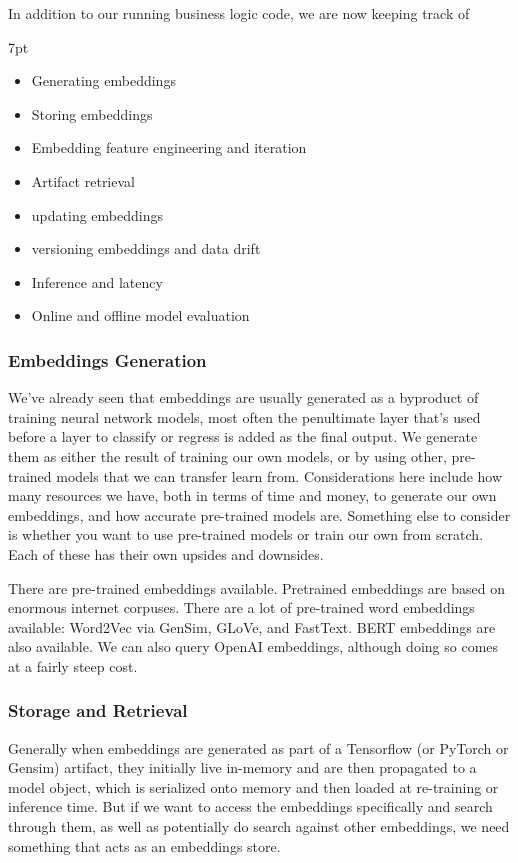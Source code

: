 \documentclass[11pt, table]{diazessay} %
\newenvironment{formal}{%
  \def\FrameCommand{%
	\hspace{1pt}%
	{\color{w_lightblue}\vrule width 2pt}%
	{\color{formalshade}\vrule width 4pt}%
	\colorbox{formalshade}%
  }%
  \MakeFramed{\advance\hsize-\width\FrameRestore}%
  \noindent\hspace{-4.55pt}%
  \begin{adjustwidth}{}{7pt}%
  \vspace{2pt}\vspace{2pt}%
}
{%
  \vspace{2pt}\end{adjustwidth}\endMakeFramed%
}
\begin{document}
\begin{sloppypar}
In addition to our running business logic code, we are now keeping track of

\begin{formal}
\begin{itemize}
  \item Generating embeddings
  \item Storing embeddings
  \item Embedding feature engineering and iteration
  \item Artifact retrieval
  \item updating embeddings
  \item versioning embeddings and data drift
  \item Inference and latency
  \item Online and offline model evaluation
\end{itemize}
\end{formal}

\subsubsection{Embeddings Generation}

We've already seen that embeddings are usually generated as a byproduct of training neural network models, most often the penultimate layer that's used before a layer to classify or regress is added as the final output. We generate them as either the result of training our own models, or by using other, pre-trained models that we can transfer learn from. Considerations here include how many resources we have, both in terms of time and money, to generate our own embeddings, and how accurate pre-trained models are. Something else to consider is whether you want to use pre-trained models or train our own from scratch. Each of these has their own upsides and downsides.

There are pre-trained embeddings available.  Pretrained embeddings are based on enormous internet corpuses.  There are a lot of pre-trained word embeddings available: Word2Vec via GenSim, GLoVe, and FastText. BERT embeddings are also available.  We can also query OpenAI embeddings, although doing so comes at a fairly steep cost.

\subsubsection{Storage and Retrieval}

Generally when embeddings are generated as part of a Tensorflow (or PyTorch or Gensim) artifact, they initially live in-memory and are then propagated to a model object, which is serialized onto memory and then loaded at re-training or inference time. But if we want to access the embeddings specifically and search through them, as well as potentially do search against other embeddings, we need something that acts as an embeddings store.


\end{sloppypar}
\end{document}
